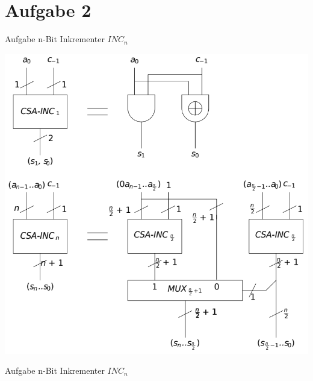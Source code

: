 
\section{Aufgabe 2}

\setcounter{exercise}{1}

\begin{frame}{Aufgabe \thesection}{n-Bit Inkrementer $INC_n$}
  \begin{solutionnoinc}
    \includegraphics[height=0.6\paperheight, center]{figures/incrementer.png}
  \end{solutionnoinc}
\end{frame} 

\begin{frame}{Aufgabe \thesection}{n-Bit Inkrementer $INC_n$}
  \begin{solution}
    \centering
    
  \end{solution}
\end{frame} 

